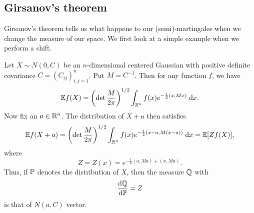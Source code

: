 \documentclass[a4paper]{article}
\begin{document}
\subsection{Girsanov's theorem}
Girsanov's theorem tells us what happens to our (semi)-martingales when we change the measure of our space. We first look at a simple example when we perform a shift.
\begin{eg}
  Let $X \sim N(0, C)$ be an $n$-dimensional centered Gaussian with positive definite covariance $C = (C_{ij})_{i, j = 1}^n$. Put $M = C^{-1}$. Then for any function $f$, we have
  \[
    \E f(X) = \left(\det \frac{M}{2\pi}\right)^{1/2} \int_{\R^n} f(x) e^{-\frac{1}{2} (x, Mx)}\;\d x.
  \]
  Now fix an $a \in \R^n$. The distribution of $X + a$ then satisfies
  \[
    \E f(X + a) = \left(\det \frac{M}{2\pi}\right)^{1/2} \int_{\R^n} f(x) e^{-\frac{1}{2} (x - a, M (x - a))}\;\d x = \E [Z f(X)],
  \]
  where
  \[
    Z = Z(x) = e^{-\frac{1}{2} (a, Ma) + (x, Ma)}.
  \]
  Thus, if $\P$ denotes the distribution of $X$, then the measure $\Q$ with
  \[
    \frac{\d \Q}{\d \P} = Z
  \]
  is that of $N(a, C)$ vector.
\end{eg}
\end{document}
